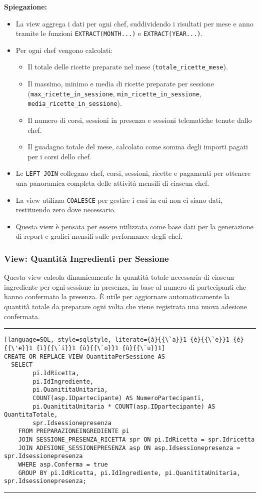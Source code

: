 \textbf{Spiegazione:}
\begin{itemize}
    \item La view aggrega i dati per ogni chef, suddividendo i risultati per mese e anno tramite le funzioni \texttt{EXTRACT(MONTH...)} e \texttt{EXTRACT(YEAR...)}.
    \item Per ogni chef vengono calcolati:
    \begin{itemize}
        \item Il totale delle ricette preparate nel mese (\texttt{totale\_ricette\_mese}).
        \item Il massimo, minimo e media di ricette preparate per sessione (\texttt{max\_ricette\_in\_sessione}, \texttt{min\_ricette\_in\_sessione}, \texttt{media\_ricette\_in\_sessione}).
        \item Il numero di corsi, sessioni in presenza e sessioni telematiche tenute dallo chef.
        \item Il guadagno totale del mese, calcolato come somma degli importi pagati per i corsi dello chef.
    \end{itemize}
    \item Le \texttt{LEFT JOIN} collegano chef, corsi, sessioni, ricette e pagamenti per ottenere una panoramica completa delle attività mensili di ciascun chef.
    \item La view utilizza \texttt{COALESCE} per gestire i casi in cui non ci siano dati, restituendo zero dove necessario.
    \item Questa view è pensata per essere utilizzata come base dati per la generazione di report e grafici mensili sulle performance degli chef.
\end{itemize}

\subsubsection{View: Quantità Ingredienti per Sessione}

Questa view calcola dinamicamente la quantità totale necessaria di ciascun ingrediente per ogni sessione in presenza, in base al numero di partecipanti che hanno confermato la presenza. È utile per aggiornare automaticamente la quantità totale da preparare ogni volta che viene registrata una nuova adesione confermata.

\noindent\rule{\textwidth}{0.4pt}
\begin{lstlisting}[language=SQL, style=sqlstyle, literate={à}{{\`a}}1 {è}{{\`e}}1 {é}{{\'e}}1 {ì}{{\`i}}1 {ò}{{\`o}}1 {ù}{{\`u}}1]
CREATE OR REPLACE VIEW QuantitaPerSessione AS
  SELECT 
        pi.IdRicetta,
        pi.IdIngrediente,
        pi.QuanititaUnitaria,
        COUNT(asp.IDpartecipante) AS NumeroPartecipanti,
        pi.QuanititaUnitaria * COUNT(asp.IDpartecipante) AS QuantitaTotale,
        spr.Idsessionepresenza
    FROM PREPARAZIONEINGREDIENTE pi
    JOIN SESSIONE_PRESENZA_RICETTA spr ON pi.IdRicetta = spr.Idricetta
    JOIN ADESIONE_SESSIONEPRESENZA asp ON asp.Idsessionepresenza = spr.Idsessionepresenza
    WHERE asp.Conferma = true
    GROUP BY pi.IdRicetta, pi.IdIngrediente, pi.QuanititaUnitaria, spr.Idsessionepresenza;
\end{lstlisting}
\noindent\rule{\textwidth}{0.4pt}

